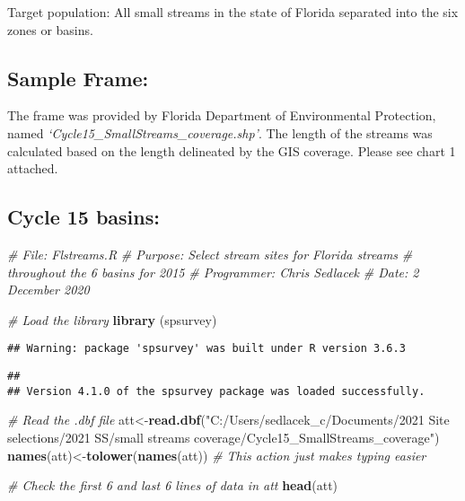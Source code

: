 \documentclass[
]{article}
\newenvironment{Shaded}{\begin{snugshade}}{\end{snugshade}}
\newcommand{\CommentTok}[1]{\textcolor[rgb]{0.56,0.35,0.01}{\textit{#1}}}
\newcommand{\KeywordTok}[1]{\textcolor[rgb]{0.13,0.29,0.53}{\textbf{#1}}}
\newcommand{\NormalTok}[1]{#1}
\newcommand{\StringTok}[1]{\textcolor[rgb]{0.31,0.60,0.02}{#1}}
\begin{document}
Target population: All small streams in the state of Florida separated
into the six zones or basins.

\hypertarget{sample-frame}{%
\subsection{\texorpdfstring{\textbf{Sample
Frame:}}{Sample Frame:}}\label{sample-frame}}

The frame was provided by Florida Department of Environmental
Protection, named \emph{`Cycle15\_SmallStreams\_coverage.shp'}. The
length of the streams was calculated based on the length delineated by
the GIS coverage. Please see chart 1 attached.

\hypertarget{cycle-15-basins}{%
\subsection{\texorpdfstring{\textbf{Cycle 15
basins:}}{Cycle 15 basins:}}\label{cycle-15-basins}}

\begin{Shaded}
\begin{Highlighting}[]
\CommentTok{# File: Flstreams.R}
\CommentTok{# Purpose: Select stream sites for Florida streams}
\CommentTok{#                 throughout the 6 basins for 2015}
\CommentTok{# Programmer: Chris Sedlacek}
\CommentTok{# Date: 2 December 2020}

\CommentTok{# Load the library}
\KeywordTok{library}\NormalTok{ (spsurvey)}
\end{Highlighting}
\end{Shaded}

\begin{verbatim}
## Warning: package 'spsurvey' was built under R version 3.6.3
\end{verbatim}

\begin{verbatim}
## 
## Version 4.1.0 of the spsurvey package was loaded successfully.
\end{verbatim}

\begin{Shaded}
\begin{Highlighting}[]
\CommentTok{# Read the .dbf file}
\NormalTok{att<-}\KeywordTok{read.dbf}\NormalTok{(}\StringTok{"C:/Users/sedlacek_c/Documents/2021 Site selections/2021 SS/small streams coverage/Cycle15_SmallStreams_coverage"}\NormalTok{)}
\KeywordTok{names}\NormalTok{(att)<-}\KeywordTok{tolower}\NormalTok{(}\KeywordTok{names}\NormalTok{(att)) }\CommentTok{# This action just makes typing easier}

\CommentTok{# Check the first 6 and last 6 lines of data in att}
\KeywordTok{head}\NormalTok{(att)}
\end{Highlighting}
\end{Shaded}
\end{document}
